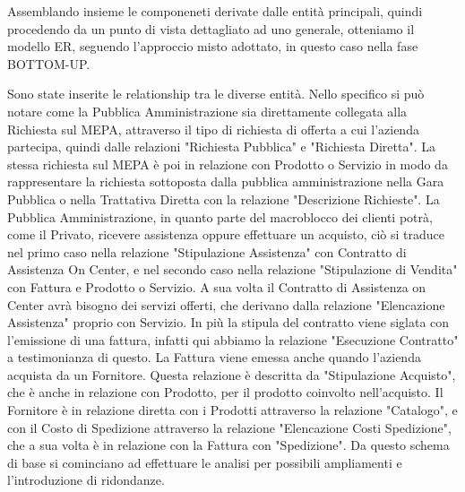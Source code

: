 Assemblando insieme le componeneti derivate dalle entità principali, quindi procedendo da un punto di vista dettagliato ad uno generale, otteniamo il modello ER, seguendo l'approccio misto adottato, in questo caso nella fase BOTTOM-UP.

\begin{landscape} %



\end{landscape}

\noindent
Sono state inserite le relationship tra le diverse entità.\newline
Nello specifico si può notare come la Pubblica Amministrazione sia direttamente collegata alla Richiesta sul MEPA, attraverso il tipo di richiesta di offerta a cui l'azienda partecipa, quindi dalle relazioni "Richiesta Pubblica" e "Richiesta Diretta". La stessa richiesta sul MEPA è poi in relazione con Prodotto o Servizio in modo da rappresentare la richiesta sottoposta dalla pubblica amministrazione nella Gara Pubblica o nella Trattativa Diretta con la relazione "Descrizione Richieste".\newline
La Pubblica Amministrazione, in quanto parte del macroblocco dei clienti potrà, come il Privato, ricevere assistenza oppure effettuare un acquisto, ciò si traduce nel primo caso nella relazione "Stipulazione Assistenza" con Contratto di Assistenza On Center, e nel secondo caso nella relazione "Stipulazione di Vendita" con Fattura e Prodotto o Servizio.\newline
A sua volta il Contratto di Assistenza on Center avrà bisogno dei servizi offerti, che derivano dalla relazione "Elencazione Assistenza" proprio con Servizio. In più la stipula del contratto viene siglata con l'emissione di una fattura, infatti qui abbiamo la relazione "Esecuzione Contratto" a testimonianza di questo.\newline
La Fattura viene emessa anche quando l'azienda acquista da un Fornitore. Questa relazione è descritta da "Stipulazione Acquisto", che è anche in relazione con Prodotto, per il prodotto coinvolto nell'acquisto.\newline
Il Fornitore è in relazione diretta con i Prodotti attraverso la relazione "Catalogo", e con il Costo di Spedizione attraverso la relazione "Elencazione Costi Spedizione", che a sua volta è in relazione con la Fattura con "Spedizione".
\newline\newline
Da questo schema di base si cominciano ad effettuare le analisi per possibili ampliamenti e l'introduzione di ridondanze.
